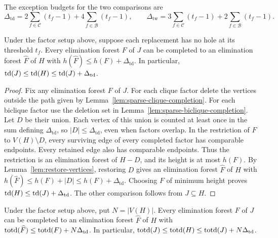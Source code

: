 The exception budgets for the two comparisons are
\[
 \Delta_{\mathrm{td}}=2\sum_{f\in\mathcal C}(t_f-1)+4\sum_{f\in\mathcal B}(t_f-1),
 \qquad
 \Delta_{\mathrm{tw}}=3\sum_{f\in\mathcal C}(t_f-1)+2\sum_{f\in\mathcal B}(t_f-1).
\]

\begin{lemma}\label{lem:factor-sparsification}
Under the factor setup above, suppose each replacement has no hole
at its threshold $t_f$. Every elimination forest $F$ of $J$ can be
completed to an elimination forest $\widehat F$ of $H$ with
$h(\widehat F)\le h(F)+\Delta_{\mathrm{td}}$. In particular,
$\operatorname{td}(J)\le\operatorname{td}(H)\le\operatorname{td}(J)+\Delta_{\mathrm{td}}$.
\end{lemma}

\begin{proof}
Fix any elimination forest $F$ of $J$.
For each clique factor delete the vertices
outside the path given by Lemma~\ref{lem:sparse-clique-completion}.
For each biclique factor use the deletion set in
Lemma~\ref{lem:sparse-biclique-completion}. Let $D$ be their union.
Each vertex of this union is counted at least once in the sum
defining $\Delta_{\mathrm{td}}$, so $|D|\le\Delta_{\mathrm{td}}$, even when factors overlap.
In the restriction of $F$ to $V(H)\setminus D$,
every surviving edge of every completed factor has comparable
endpoints. Every retained edge also has comparable endpoints.
Thus the restriction is an elimination forest of $H-D$, and its
height is at most $h(F)$. By Lemma~\ref{lem:restore-vertices},
restoring $D$ gives an elimination forest $\widehat F$ of $H$ with
$h(\widehat F)\le h(F)+|D|\le h(F)+\Delta_{\mathrm{td}}$.
Choosing $F$ of minimum height proves
$\operatorname{td}(H)\le\operatorname{td}(J)+\Delta_{\mathrm{td}}$. The other comparison follows from
$J\subseteq H$.
\end{proof}

\begin{lemma}
\label{lem:total-depth-comparison}
Under the factor setup above, put $N=|V(H)|$. Every elimination
forest $F$ of $J$ can be completed to an elimination forest
$\widehat F$ of $H$ with
$\operatorname{totd}(\widehat F)\le\operatorname{totd}(F)+N\Delta_{\mathrm{td}}$.
In particular, $\operatorname{totd}(J)\le \operatorname{totd}(H)\le \operatorname{totd}(J)+N\Delta_{\mathrm{td}}$.
\end{lemma}

